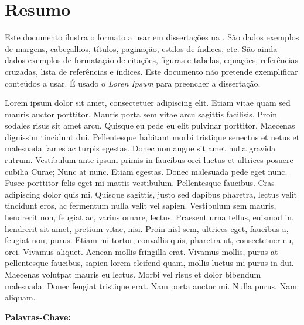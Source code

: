 \chapter*{Resumo}

Este documento ilustra o formato a usar em dissertações na \Feup.
São dados exemplos de margens, cabeçalhos, títulos, paginação, estilos
de índices, etc. 
São ainda dados exemplos de formatação de citações, figuras e tabelas,
equações, referências cruzadas, lista de referências e índices.
Este documento não pretende exemplificar conteúdos a usar. 
É usado o \emph{Loren Ipsum} para preencher a dissertação.

Lorem ipsum dolor sit amet, consectetuer adipiscing elit. Etiam vitae
quam sed mauris auctor porttitor. Mauris porta sem vitae arcu sagittis
facilisis. Proin sodales risus sit amet arcu. Quisque eu pede eu elit
pulvinar porttitor. Maecenas dignissim tincidunt dui. Pellentesque
habitant morbi tristique senectus et netus et malesuada fames ac
turpis egestas. Donec non augue sit amet nulla gravida
rutrum. Vestibulum ante ipsum primis in faucibus orci luctus et
ultrices posuere cubilia Curae; Nunc at nunc. Etiam egestas. 
Donec malesuada pede eget nunc. Fusce porttitor felis eget mi mattis
vestibulum. Pellentesque faucibus. Cras adipiscing dolor quis
mi. Quisque sagittis, justo sed dapibus pharetra, lectus velit
tincidunt eros, ac fermentum nulla velit vel sapien. Vestibulum sem
mauris, hendrerit non, feugiat ac, varius ornare, lectus. Praesent
urna tellus, euismod in, hendrerit sit amet, pretium vitae,
nisi. Proin nisl sem, ultrices eget, faucibus a, feugiat non,
purus. Etiam mi tortor, convallis quis, pharetra ut, consectetuer eu,
orci. Vivamus aliquet. Aenean mollis fringilla erat. Vivamus mollis,
purus at pellentesque faucibus, sapien lorem eleifend quam, mollis
luctus mi purus in dui. Maecenas volutpat mauris eu lectus. Morbi vel
risus et dolor bibendum malesuada. Donec feugiat tristique erat. Nam
porta auctor mi. Nulla purus. Nam aliquam. \newline

\noindent\textbf{Palavras-Chave: }%
\makeatletter
\@keywordsPT
\makeatother